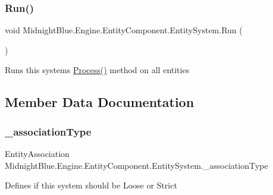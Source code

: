 \subsubsection{\texorpdfstring{Run()}{Run()}}
{\footnotesize\ttfamily void Midnight\+Blue.\+Engine.\+Entity\+Component.\+Entity\+System.\+Run (\begin{DoxyParamCaption}{ }\end{DoxyParamCaption})\hspace{0.3cm}{\ttfamily [inline]}}



Runs this systems \hyperlink{class_midnight_blue_1_1_engine_1_1_entity_component_1_1_entity_system_a94aa715ac6bfe9a720c3d12d56c7598c}{Process()} method on all entities 



\subsection{Member Data Documentation}
\hypertarget{class_midnight_blue_1_1_engine_1_1_entity_component_1_1_entity_system_a938cb3fb0fca73406472f0c44be8641e}{}\label{class_midnight_blue_1_1_engine_1_1_entity_component_1_1_entity_system_a938cb3fb0fca73406472f0c44be8641e} 
\subsubsection{\texorpdfstring{\+\_\+association\+Type}{\_associationType}}
{\footnotesize\ttfamily Entity\+Association Midnight\+Blue.\+Engine.\+Entity\+Component.\+Entity\+System.\+\_\+association\+Type\hspace{0.3cm}{\ttfamily [protected]}}



Defines if this system should be Loose or Strict 

\hypertarget{class_midnight_blue_1_1_engine_1_1_entity_component_1_1_entity_system_ad1760cf695261ba2f87740d0fd1e0e8c}{}\label{class_midnight_blue_1_1_engine_1_1_entity_component_1_1_entity_system_ad1760cf695261ba2f87740d0fd1e0e8c} 
